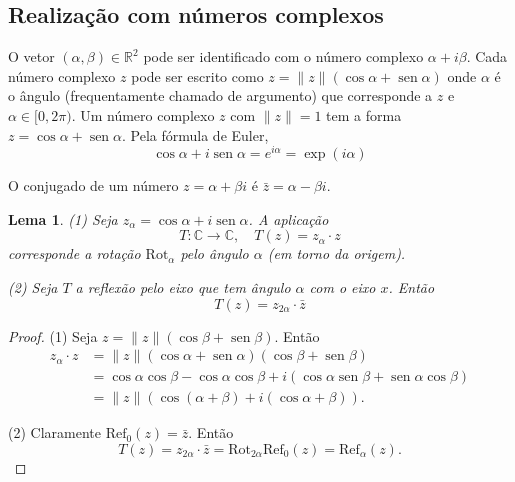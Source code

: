 \documentclass[12pt]{amsart}
\newcommand{\C}{\mathbb C}
\newcommand{\R}{\mathbb R}
\DeclareMathOperator{\sen}{\text{sen}}
\newcommand{\rot}[1]{{\textrm{Rot}}_{#1}}
\newcommand{\refl}[1]{{\textrm{Ref}}_{#1}}
\newtheorem{lemma}[theorem]{Lema}
\theoremstyle{definition}
\begin{document}
\subsection{Realização com números complexos}

O vetor $(\alpha,\beta)\in\R^2$ pode ser identificado com o número complexo $\alpha+i\beta$. 
Cada número complexo $z$ pode ser escrito como $z=\|z\|(\cos \alpha+\sen\alpha)$ onde $\alpha$ é o ângulo 
(frequentamente chamado de argumento) que corresponde a $z$ e $\alpha\in[0,2\pi)$. Um número complexo 
$z$ com $\|z\|=1$ tem a forma $z=\cos\alpha+\sen\alpha$. Pela fórmula de Euler, 
\[
    \cos\alpha+i\sen\alpha = e^{i\alpha}=\exp(i\alpha)
\]

O conjugado de um número $z=\alpha+\beta i$ é $\bar z=\alpha-\beta i$. 

\begin{lemma}
    (1) Seja $z_\alpha=\cos\alpha+i\sen\alpha$. A aplicação 
    \[
        T:\C\to\C,\quad T(z)=z_\alpha\cdot z
    \] 
corresponde a rotação $\rot\alpha$ pelo ângulo $\alpha$ (em torno da origem). 

(2) Seja $T$ a reflexão pelo eixo que tem ângulo $\alpha$ com o eixo $x$. Então 
\[
    T(z)=z_{2\alpha}\cdot \bar z
\]
 \end{lemma}
 \begin{proof}
(1) Seja $z=\|z\|(\cos\beta+\sen\beta)$. Então 
\begin{align*}
    z_\alpha\cdot z&=\|z\|(\cos\alpha+\sen\alpha)(\cos\beta+\sen\beta)\\&=
    \cos\alpha\cos\beta-\cos\alpha\cos\beta+i(\cos\alpha\sen\beta+\sen\alpha\cos\beta)\\&=
    \|z\|(\cos(\alpha+\beta)+i(\cos\alpha+\beta)).
\end{align*}
 
(2) Claramente $\refl 0(z)=\bar z$. Então 
\[
    T(z)=z_{2\alpha}\cdot \bar z=\rot{2\alpha}\refl 0(z)=\refl{\alpha}(z).
\]
 \end{proof}
\end{document}

